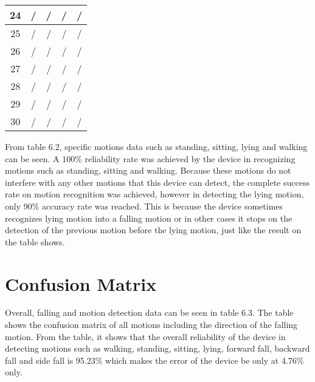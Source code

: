 \begin{table}[htbp]
{\begin{tabular}{|c|c|c|c|c|}
    \midrule
    24    & /     & /     & /     & / \\
    \midrule
    25    & /     & /     & /     & / \\
    \midrule
    26    & /     & /     & /     & / \\
    \midrule
    27    & /     & /     & /     & / \\
    \midrule
    28    & /     & /     & /     & / \\
    \midrule
    29    & /     & /     & /     & / \\
    \midrule
    30    & /     & /     & /     & / \\
    \bottomrule
    \end{tabular}%
		}
  \label{tab:Motion Detection Data}%
\end{table}%


From table 6.2, specific motions data such as standing, sitting, lying and walking can be seen. A 100\% reliability rate was achieved by the device in recognizing motions such as standing, sitting and walking. Because these motions do not interfere with any other motions that this device can detect, the complete success rate on motion recognition was achieved, however in detecting the lying motion, only 90\% accuracy rate was reached. This is because the device sometimes recognizes lying motion into a falling motion or in other cases it stops on the detection of the previous motion before the lying motion, just like the result on the table shows.

\section{Confusion Matrix}

Overall, falling and motion detection data can be seen in table 6.3. The table shows the confusion matrix of all motions including the direction of the falling motion. From the table, it shows that the overall reliability of the device in detecting motions such as walking, standing, sitting, lying, forward fall, backward fall and side fall is 95.23\% which makes the error of the device be only at 4.76\% only.


